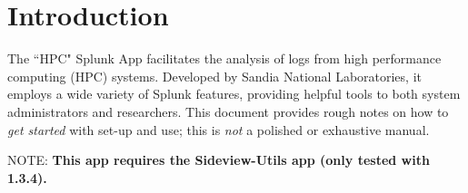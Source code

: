 \section{Introduction}
The ``HPC" Splunk App facilitates the analysis of logs from high performance
computing (HPC) systems.  Developed by Sandia National Laboratories, it employs
a wide variety of Splunk features, providing helpful tools to both system
administrators and researchers.  This document provides rough notes on how to
{\em get started} with set-up and use; this is {\em not} a polished or
exhaustive manual.

NOTE: {\bf This app requires the Sideview-Utils app (only tested with 1.3.4).}
